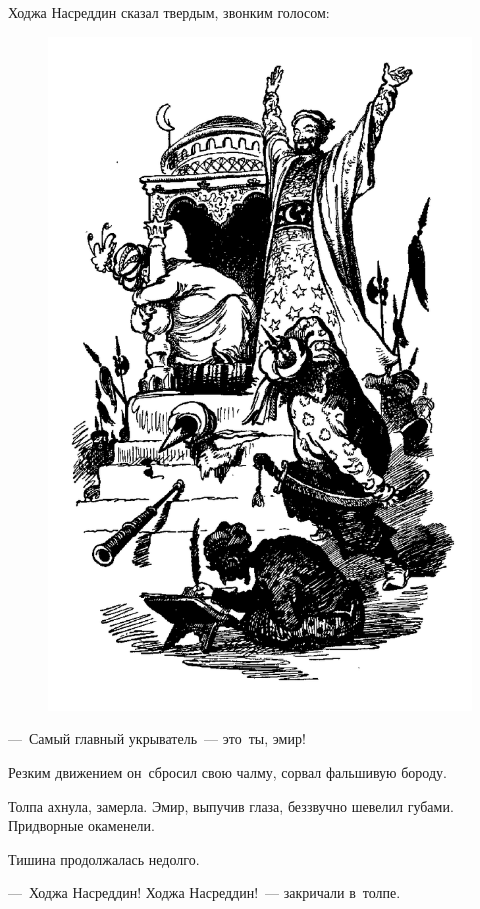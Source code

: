 \documentclass[12pt,a4paper]{book}
\begin{document}
Ходжа Насреддин сказал твердым, звонким голосом:

\begin{figure}[p]
\centering
\includegraphics[width=\textwidth]{18.png}
\end{figure}

—~Самый главный укрыватель~— это~ты, эмир!

Резким движением он~сбросил свою чалму, сорвал фальшивую бороду.

Толпа ахнула, замерла. Эмир, выпучив глаза, беззвучно шевелил губами. Придворные окаменели.

Тишина продолжалась недолго.

—~Ходжа Насреддин! Ходжа Насреддин!~— закричали в~толпе.
\end{document}
